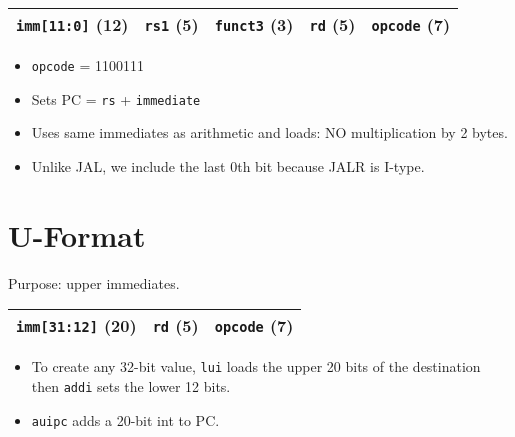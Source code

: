 \medskip
\begin{tabular}{|c|c|c|c|c|}
    \hline
    \texttt{imm[11:0]} (12) &
    \texttt{rs1} (5) &
    \texttt{funct3} (3) &
    \texttt{rd} (5) &
    \texttt{opcode} (7) \\
    \hline
\end{tabular}
\begin{itemize}
    \item \texttt{opcode} = 1100111
    \item Sets PC = \texttt{rs} + \texttt{immediate}
    \item Uses same immediates as arithmetic and loads: NO multiplication by 2 bytes.
    \item Unlike JAL, we include the last 0th bit because JALR is I-type.
\end{itemize}

\section{U-Format}
Purpose: upper immediates.

\medskip
\begin{tabular}{|c|c|c|}
    \hline
    \texttt{imm[31:12]} (20) &
    \texttt{rd} (5) &
    \texttt{opcode} (7) \\
    \hline
\end{tabular}
\begin{itemize}
    \item To create any 32-bit value, \texttt{lui} loads the upper 20 bits of the destination then \texttt{addi} sets the lower 12 bits.
    \item \texttt{auipc} adds a 20-bit int to PC.
\end{itemize}
